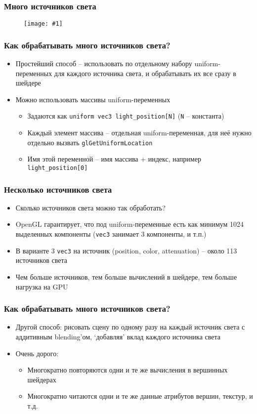 \documentclass{beamer}
\newcommand{\slideimage}[1]{
  \begin{figure}
    \begin{adjustbox}{width=\textwidth, totalheight=\textheight-2\baselineskip-2\baselineskip,keepaspectratio}
      \texttt{[image: \#1]}
    \end{adjustbox}
  \end{figure}
}
\begin{document}
\begin{frame}[fragile]
\frametitle{Много источников света}
\slideimage{many-lights.png}
\end{frame}

\begin{frame}[fragile]
\frametitle{Как обрабатывать много источников света?}
\begin{itemize}
\item Простейший способ -- использовать по отдельному набору uniform-переменных для каждого источника света, и обрабатывать их все сразу в шейдере
\pause
\item Можно использовать массивы uniform-переменных
\pause
\begin{itemize}
\item Задаются как \verb|uniform vec3 light_position[N]| (\verb|N| -- константа)
\item Каждый элемент массива -- отдельная uniform-переменная, для неё нужно отдельно вызвать \verb|glGetUniformLocation|
\item Имя этой переменной -- имя массива + индекс, например \verb|light_position[0]|
\end{itemize}
\end{itemize}
\end{frame}

\begin{frame}[fragile]
\frametitle{Несколько источников света}
\begin{itemize}
\item Сколько источников света можно так обработать?
\pause
\item OpenGL гарантирует, что под uniform-переменные есть как минимум 1024 выделенных компоненты (\verb|vec3| занимает 3 компоненты, и т.п.)
\pause
\item В варианте 3 \verb|vec3| на источник (position, color, attenuation) -- около 113 источников света
\pause
\item Чем больше источников, тем больше вычислений в шейдере, тем больше нагрузка на GPU
\end{itemize}
\end{frame}

\begin{frame}[fragile]
\frametitle{Как обрабатывать много источников света?}
\begin{itemize}
\item Другой способ: рисовать сцену по одному разу на каждый источник света с аддитивным blending'ом, `добавляя' вклад каждого источника света
\pause
\item Очень дорого:
\begin{itemize}
\item Многократно повторяются одни и те же вычисления в вершинных шейдерах
\item Многократно читаются одни и те же данные атрибутов вершин, текстур, и т.д.
\end{itemize}
\end{itemize}
\end{frame}
\end{document}
